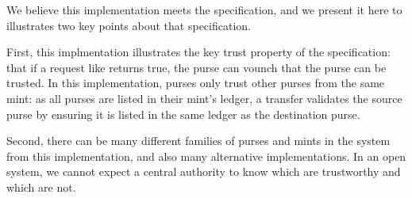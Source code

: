 We believe this implementation meets the 
specification, and we present it here to illustrates two key points
about that specification. 

First, this implmentation illustrates the key trust property of the
 specification: that if a request like
 returns true, the  purse can
vounch that the  purse can be trusted. In this
implementation, purses only trust other purses from the same mint: as 
all purses are listed in their mint's ledger, a transfer validates the
source purse by ensuring it is listed in the same ledger as the
destination purse. 

Second, there can be many different families of purses and mints in
the system from this implementation, and also many alternative
implementations. In an open system, we cannot expect a central
authority to know which are trustworthy and which are not.
